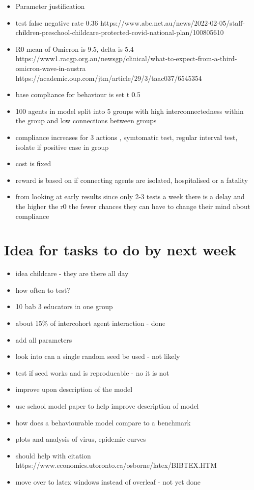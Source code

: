 \documentclass{article}
\begin{document}
\begin{itemize}



\item Parameter justification
\item test false negative rate 0.36 https://www.abc.net.au/news/2022-02-05/staff-children-preschool-childcare-protected-covid-national-plan/100805610
\item R0 mean of Omicron is 9.5, delta is 5.4  https://www1.racgp.org.au/newsgp/clinical/what-to-expect-from-a-third-omicron-wave-in-austra https://academic.oup.com/jtm/article/29/3/taac037/6545354
\item base compliance for behaviour is set t 0.5
\item 100 agents in model split into 5 groups with high interconnectedness within the group and low connections between groups

\item compliance increases for 3 actions , symtomatic test, regular interval test, isolate if positive case in group
\item cost is fixed
\item reward is based on if connecting agents are isolated, hospitalised or a fatality

\item from looking at early results since only 2-3 tests a week there is a delay and the higher the r0 the fewer chances they can have to change their mind about compliance 
\end{itemize}

\section{Idea for tasks to do by next week}
\begin{itemize}
\item idea childcare - they are there all day
\item how often to test?
\item 10 bab 3 educators in one group
\item about 15\% of intercohort agent interaction - done
\item add all parameters 
\item look into can a single random seed be used - not likely
\item test if seed works and is reproducable - no it is not

\item improve upon description of the model
\item use school model paper to help improve description of model
\item how does a behaviourable model compare to a benchmark
\item plots and analysis of virus, epidemic curves
\item should help with citation https://www.economics.utoronto.ca/osborne/latex/BIBTEX.HTM
 

\item move over to latex windows instead of overleaf - not yet done
\end{itemize}
\end{document}
